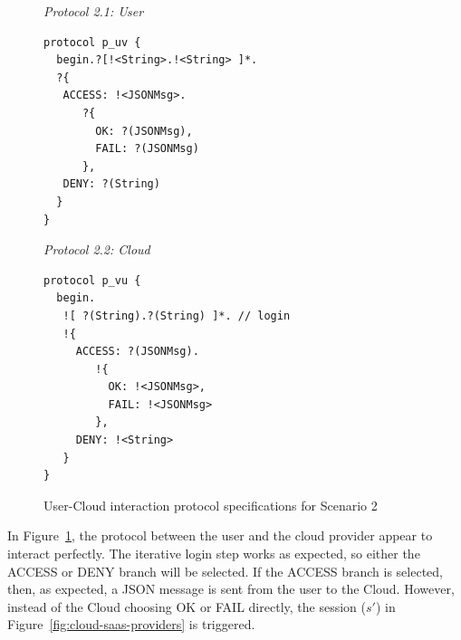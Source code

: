 \documentclass[10pt]{llncs}
\begin{document}
{
\lstset{
  framerule=0pt,
  numbers=none,
  basicstyle=\ttfamily\scriptsize,
}
\begin{figure}[h]
\begin{minipage}[t]{0.50\textwidth}
{\it\footnotesize Protocol 2.1: User}
\begin{lstlisting}
protocol p_uv { 
  begin.?[!<String>.!<String> ]*.
  ?{
   ACCESS: !<JSONMsg>.
      ?{
        OK: ?(JSONMsg),
        FAIL: ?(JSONMsg)
      },
   DENY: ?(String)
  } 
}
\end{lstlisting}
\end{minipage}
\begin{minipage}[t]{0.50\textwidth}
{\it\footnotesize Protocol 2.2: Cloud}
\begin{lstlisting}
protocol p_vu { 
  begin.
   ![ ?(String).?(String) ]*. // login
   !{
     ACCESS: ?(JSONMsg).
        !{
          OK: !<JSONMsg>,
          FAIL: !<JSONMsg>
        },
     DENY: !<String>
   } 
}
\end{lstlisting}
\end{minipage}
\caption{User-Cloud interaction protocol specifications for Scenario 2}\label{fig:user-cloud-protocol} 
\end{figure}
}

In Figure~\ref{fig:user-cloud-protocol}, the protocol between the user and the cloud provider appear to interact perfectly. The iterative login step works as expected, so either the ACCESS or DENY branch will be selected. 
If the ACCESS branch is selected, then, as expected, a JSON message is sent from the user to the Cloud. However, instead of the Cloud choosing OK or FAIL directly, the session ($s'$) in Figure~\ref{fig:cloud-saas-providers} is triggered.



%



\end{document}
